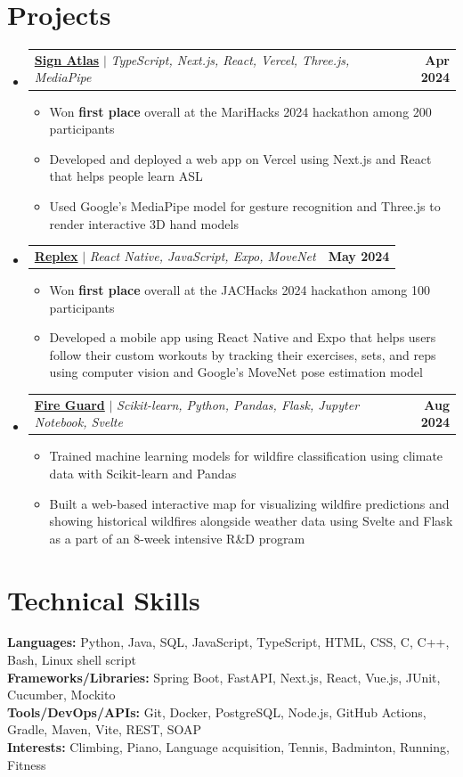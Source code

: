 \documentclass[letterpaper,11pt]{article}
\makeatletter
\newcommand{\resumeItem}[1]{
  \item\small{
    {#1 \vspace{-2pt}}
  }
}
\newcommand{\resumeProjectHeading}[4]{
  \item
  \begin{tabular*}{\textwidth}{l@{\extracolsep{\fill}}r}
    \small{\href{#3}{\textbf{#1}\hspace{0.3em}{\faLink}} $|$ \emph{#2}} & \textbf{\small #4} \\
  \end{tabular*}\vspace{-7pt}
}
\newcommand{\resumeSubHeadingListStart}{\begin{itemize}[leftmargin=0in, label={}]}
\newcommand{\resumeSubHeadingListEnd}{\end{itemize}}
\newcommand{\resumeItemListStart}{\begin{itemize}}
\newcommand{\resumeItemListEnd}{\end{itemize}\vspace{-5pt}}
\makeatother
\begin{document}
\section{Projects}
    \resumeSubHeadingListStart
      \resumeProjectHeading
          {Sign Atlas}
          {TypeScript, Next.js, React, Vercel, Three.js, MediaPipe}
          {https://devpost.com/software/sign-atlas}
          {Apr 2024}
          \resumeItemListStart
            \resumeItem{Won \textbf{first place} overall at the MariHacks 2024 hackathon among 200 participants}
            \resumeItem{Developed and deployed a web app on Vercel using Next.js and React that helps people learn ASL}
            \resumeItem{Used Google's MediaPipe model for gesture recognition and Three.js to render interactive 3D hand models}
          \resumeItemListEnd
      \resumeProjectHeading
          {Replex}
          {React Native, JavaScript, Expo, MoveNet}
          {https://devpost.com/software/replex}
          {May 2024}
          \resumeItemListStart
            \resumeItem{Won \textbf{first place} overall at the JACHacks 2024 hackathon among 100 participants}
            \resumeItem{Developed a mobile app using React Native and Expo that helps users follow their custom workouts by tracking their exercises, sets, and reps using computer vision and Google’s MoveNet pose estimation model}
          \resumeItemListEnd
      \resumeProjectHeading
          {Fire Guard}
          {Scikit-learn, Python, Pandas, Flask, Jupyter Notebook, Svelte}
          {https://github.com/tran-ethan/fire-guard}
          {Aug 2024}
          \resumeItemListStart
            \resumeItem{Trained machine learning models for wildfire classification using climate data with Scikit-learn and Pandas}
            \resumeItem{Built a web-based interactive map for visualizing wildfire predictions and showing historical wildfires alongside weather data using Svelte and Flask as a part of an 8-week intensive R\&D program}
          \resumeItemListEnd
    \resumeSubHeadingListEnd

%
\section{Technical Skills}
 \begin{itemize}[leftmargin=0in, label={}]
    \small{\item{
     \textbf{Languages:}{ Python, Java, SQL, JavaScript, TypeScript, HTML, CSS, C, C++, Bash, Linux shell script} \\
     \textbf{Frameworks/Libraries:}{ Spring Boot, FastAPI, Next.js, React, Vue.js, JUnit, Cucumber, Mockito} \\
     \textbf{Tools/DevOps/APIs:}{ Git, Docker, PostgreSQL, Node.js, GitHub Actions, Gradle, Maven, Vite, REST, SOAP } \\
     \textbf{Interests:}{ Climbing, Piano, Language acquisition, Tennis, Badminton, Running, Fitness } \\
    }}
 \end{itemize}

\end{document}
